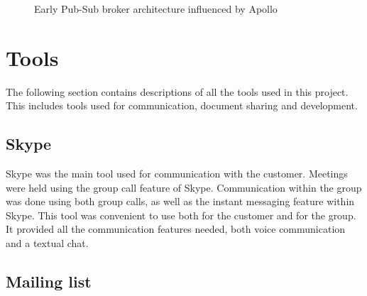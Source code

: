 \clearpage

\begin{center}
  \begin{figure}[ht!]
    \caption{Early Pub-Sub broker architecture influenced by Apollo}
    \label{fig:arch_proposal}
  \end{figure}
\end{center}

\section{Tools}
\label{sec:prestudies-tools}

The following section contains descriptions of all the tools used in this project. This includes tools used for communication, document sharing and development.

\subsection{Skype}
\label{subsec:prestudies-tools-skype}

Skype \cite{skype} was the main tool used for communication with the customer. Meetings were held using the group call feature of Skype. Communication within the group was done using both group calls, as well as the instant messaging feature within Skype. This tool was convenient to use both for the customer and for the group. It provided all the communication features needed, both voice communication and a textual chat.

\subsection{Mailing list}
\label{subsec:prestudies-tools-mailinglist}


